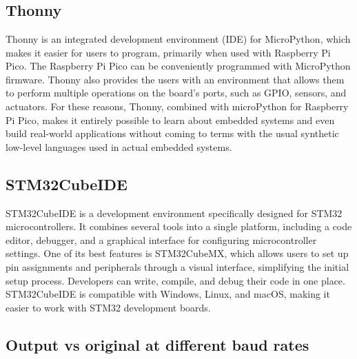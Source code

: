 \chapter{}


\section{Thonny}\label{appendix:A1}
Thonny is an integrated development environment (IDE) for MicroPython, which makes it easier for users to program, primarily when used with Raspberry Pi Pico. The Raspberry Pi Pico can be conveniently programmed with MicroPython firmware. Thonny also provides the users with an environment that allows them to perform multiple operations on the board’s ports, such as GPIO, sensors, and actuators. For these reasons, Thonny, combined with microPython for Raspberry Pi Pico, makes it entirely possible to learn about embedded systems and even build real-world applications without coming to terms with the usual synthetic low-level languages used in actual embedded systems.

\section{STM32CubeIDE}\label{appendix:A2}

STM32CubeIDE is a development environment specifically designed for STM32 microcontrollers. It combines several tools into a single platform, including a code editor, debugger, and a graphical interface for configuring microcontroller settings. One of its best features is STM32CubeMX, which allows users to set up pin assignments and peripherals through a visual interface, simplifying the initial setup process. Developers can write, compile, and debug their code in one place. STM32CubeIDE is compatible with Windows, Linux, and macOS, making it easier to work with STM32 development boards.

\section{Output vs original at different baud rates}\label{appendix:A3}


